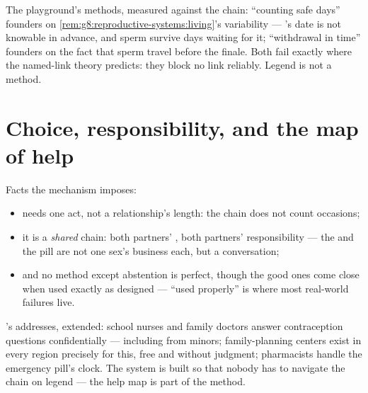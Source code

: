 \begin{remark}\label{rem:g8:contraception:notwork}
The playground's methods, measured against the chain:
``counting safe days'' founders on
\cref{rem:g8:reproductive-systems:living}'s variability
--- 's date is not knowable in advance, and
sperm survive days waiting for it; ``withdrawal in time''
founders on the fact that sperm travel before the finale.
Both fail exactly where the named-link theory predicts:
they block no link reliably. Legend is not a method.
\end{remark}

\section{Choice, responsibility, and the map of help}

\begin{proposition}\label{prop:g8:contraception:choice}
Facts the mechanism imposes:
\begin{itemize}
  \item {} needs one act, not a relationship's
        length: the chain does not count occasions;
  \item it is a \emph{shared} chain: both partners' ,
        both partners' responsibility --- the  and
        the pill are not one sex's business each, but a
        conversation;
  \item and no method except abstention is perfect, though
        the good ones come close when used exactly as
        designed --- ``used properly'' is where most
        real-world failures live.
\end{itemize}
\end{proposition}
\admitted

\begin{example}\label{ex:g8:contraception:help}
's addresses, extended:
school nurses and family doctors answer contraception
questions confidentially --- including from minors;
family-planning centers exist in every region precisely
for this, free and without judgment; pharmacists handle
the emergency pill's clock. The system is built so that
nobody has to navigate the chain on legend --- the help
map is part of the method.
\end{example}

